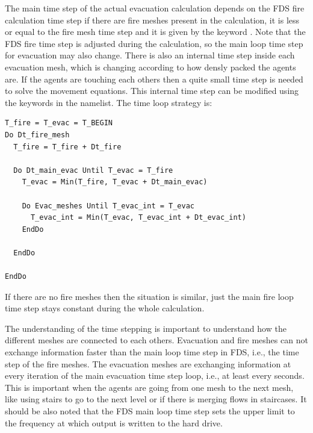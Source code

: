 \documentclass[12pt,a4paper,final,twoside]{stylevk}
\begin{document}
The main time step of the actual evacuation calculation depends on the
FDS fire calculation time step if there are fire meshes present in the
calculation, it is less or equal to the fire mesh time step and it is
given by the keyword .  Note that the
FDS fire time step is adjusted during the calculation, so the main
loop time step for evacuation may also change.  There is also an
internal time step inside each evacuation mesh, which is changing
according to how densly packed the agents are.  If the agents are
touching each others then a quite small time step is needed to solve
the movement equations.  This internal time step can be modified using
the keywords in the  namelist.  The time loop strategy is:
\begin{verbatim}
T_fire = T_evac = T_BEGIN
Do Dt_fire_mesh
  T_fire = T_fire + Dt_fire

  Do Dt_main_evac Until T_evac = T_fire
    T_evac = Min(T_fire, T_evac + Dt_main_evac)

    Do Evac_meshes Until T_evac_int = T_evac
      T_evac_int = Min(T_evac, T_evac_int + Dt_evac_int)
    EndDo

  EndDo

EndDo
\end{verbatim}
If there are no fire meshes then the situation is similar, just the
main fire loop time step stays constant during the whole calculation.


The understanding of the time stepping is important to understand how
the different meshes are connected to each others.  Evacuation and
fire meshes can not exchange information faster than the main loop
time step in FDS, i.e., the time step of the fire meshes.  The
evacuation meshes are exchanging information at every iteration of the
main evacuation time step loop, i.e., at least every
 seconds.  This is important when the
agents are going from one mesh to the next mesh, like using stairs to
go to the next level or if there is merging flows in staircases.  It
should be also noted that the FDS main loop time step sets the upper
limit to the frequency at which output is written to the hard drive.
\end{document}
